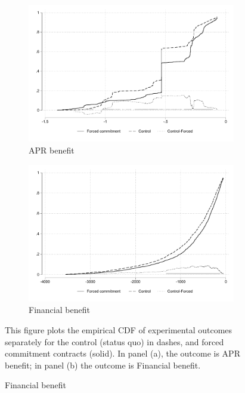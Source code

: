 \begin{figure}[!h]
        \caption{Empirical CDF: Forced commitment vs Control FOSF}
    \label{ecdf_fc}
    \begin{center}
        \begin{subfigure}{0.49\textwidth}
         \caption{APR benefit}
         \centering
         \includegraphics[width=\textwidth]{Figuras/cdf_apr.pdf}
     \end{subfigure} 
   \begin{subfigure}{0.49\textwidth}
        \caption{Financial benefit}
        \centering
        \includegraphics[width=\textwidth]{Figuras/cdf_fc_admin.pdf}
    \end{subfigure} 
    \end{center}
    \scriptsize This figure plots the empirical CDF of experimental outcomes separately for the control (status quo) in dashes, and forced commitment contracts (solid). In panel (a), the outcome is APR benefit; in panel (b) the outcome is Financial benefit. 

\end{figure}
